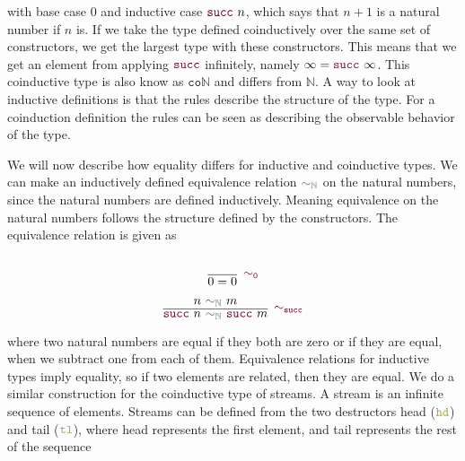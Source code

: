 \documentclass[twoside,11pt,openright]{report}
\theoremstyle{plain} %
\theoremstyle{definition}
\theoremstyle{remark}
\newcommand*{\relation}[1]{\textcolor{gray!75!black}{\ensuremath{\mathtt{#1}}}}
\newcommand*{\constructor}[1]{\textcolor{purple!60!black}{\ensuremath{\mathtt{#1}}}}
\newcommand*{\destructor}[1]{\textcolor{yellow!60!black}{\ensuremath{\mathtt{#1}}}}
\begin{document}
with base case 0 and inductive case \(\constructor{succ}~n\), which says that \(n+1\) is a natural number if \(n\) is. If we take the type defined coinductively over the same set of constructors, we get the largest type with these constructors. This means that we get an element from applying \(\constructor{succ}\) infinitely, namely \(\infty = \constructor{succ}~\infty\). This coinductive type is also know as \(\mathtt{co}\mathbb{N}\) and differs from \(\mathbb{N}\). A way to look at inductive definitions is that the rules describe the structure of the type. For a coinduction definition the rules can be seen as describing the observable behavior of the type.

We will now describe how equality differs for inductive and coinductive types. We can make an inductively defined equivalence relation \(\relation{\sim_{\mathbb{N}}}\) on the natural numbers, since the natural numbers are defined inductively. Meaning equivalence on the natural numbers follows the structure defined by the constructors. The equivalence relation is given as\\[-10mm]
\begin{center}
  \strut
  \hfill
  \begin{minipage}{0.20\linewidth}
    \begin{equation}
      \vcenter{\infer[\constructor{\sim_{0}}]{0 = 0}{\strut}}
    \end{equation}
  \end{minipage}
  \hfill
  \begin{minipage}{0.35\linewidth}
    \begin{equation}
      \vcenter{\infer[\constructor{\sim_{succ}}]{\constructor{succ}~n~\relation{\sim_{\mathbb{N}}}~\constructor{succ}~m}{n~\relation{\sim_{\mathbb{N}}}~m}}
    \end{equation}
  \end{minipage}
  \hfill
  \strut
\end{center}
where two natural numbers are equal if they both are zero or if they are equal, when we subtract one from each of them. Equivalence relations for inductive types imply equality, so if two elements are related, then they are equal. We do a similar construction for the coinductive type of streams. A stream is an infinite sequence of elements. Streams can be defined from the two destructors head (\(\destructor{hd}\)) and tail (\(\destructor{tl}\)), where head represents the first element, and tail represents the rest of the sequence\\[-10mm]
\end{document}
